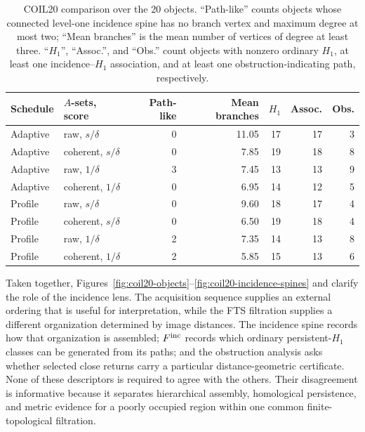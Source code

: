 \documentclass[a4paper,11pt]{article}
\theoremstyle{definition}
\theoremstyle{remark}
\begin{document}
\begin{table}[!ht]
\centering
\caption{COIL20 comparison over the 20 objects. ``Path-like'' counts objects whose connected level-one incidence spine has no branch vertex and maximum degree at most two; ``Mean branches'' is the mean number of vertices of degree at least three. ``$H_1$'', ``Assoc.'', and ``Obs.'' count objects with nonzero ordinary $H_1$, at least one incidence--$H_1$ association, and at least one obstruction-indicating path, respectively.}
\label{tab:coil20-joint}
\begin{tabular}{llrrrrr}
\toprule
Schedule & $A$-sets, score & Path-like & Mean branches & $H_1$ & Assoc. & Obs.\\
\midrule
Adaptive & raw, $s/\delta$ & 0 & 11.05 & 17 & 17 & 3\\
Adaptive & coherent, $s/\delta$ & 0 & 7.85 & 19 & 18 & 8\\
Adaptive & raw, $1/\delta$ & 3 & 7.45 & 13 & 13 & 9\\
Adaptive & coherent, $1/\delta$ & 0 & 6.95 & 14 & 12 & 5\\
Profile & raw, $s/\delta$ & 0 & 9.60 & 18 & 17 & 4\\
Profile & coherent, $s/\delta$ & 0 & 6.50 & 19 & 18 & 4\\
Profile & raw, $1/\delta$ & 2 & 7.35 & 14 & 13 & 8\\
Profile & coherent, $1/\delta$ & 2 & 5.85 & 15 & 13 & 6\\
\bottomrule
\end{tabular}
\end{table}

Taken together, Figures~\ref{fig:coil20-objects}--\ref{fig:coil20-incidence-spines} and  clarify the role of the incidence lens. The acquisition sequence supplies an external ordering that is useful for interpretation, while the FTS filtration supplies a different organization determined by image distances. The incidence spine records how that organization is assembled; $F^{\rm inc}$ records which ordinary persistent-$H_1$ classes can be generated from its paths; and the obstruction analysis asks whether selected close returns carry a particular distance-geometric certificate. None of these descriptors is required to agree with the others. Their disagreement is informative because it separates hierarchical assembly, homological persistence, and metric evidence for a poorly occupied region within one common finite-topological filtration.
\end{document}
